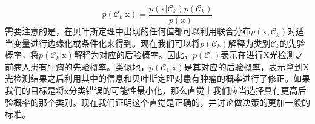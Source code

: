 \documentclass[b5paper]{book}
\numberwithin{equation}{chapter}
\begin{document}
{	\begin{equation}
		p(\mathcal{C}_k | \boldsymbol{\mathrm{x}}) = \frac{p(\boldsymbol{\mathrm{x}}|\mathcal{C}_k)p(\mathcal{C}_k)}{p(\boldsymbol{\mathrm{x}})}
	\end{equation}
	需要注意的是，在贝叶斯定理中出现的任何值都可以利用联合分布$p(\boldsymbol{\mathrm{x}},\mathcal{C}_k)$对适当变量进行边缘化或条件化来得到。现在我们可以将$p(\mathcal{C}_k)$解释为类别$\mathcal{C}_k$的先验概率，将$p(\mathcal{C}_k | \boldsymbol{\mathrm{x}})$解释为对应的后验概率。因此，$p(\mathcal{C}_1)$表示在进行X光检测之前病人患有肿瘤的先验概率。类似地，$p(\mathcal{C}_1 | \boldsymbol{\mathrm{x}})$是其对应的后验概率，表示拿到X光检测结果之后利用其中的信息和贝叶斯定理对患有肿瘤的概率进行了修正。如果我们的目标是将$\boldsymbol{\mathrm{x}}$分类错误的可能性最小化，那么直觉上我们应当选择具有更高后验概率的那个类别。现在我们证明这个直觉是正确的，并讨论做决策的更加一般的标准。}
\end{document}
